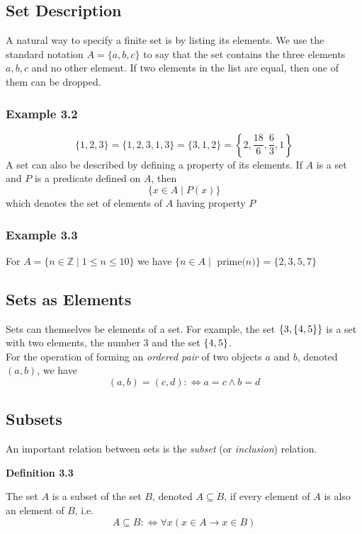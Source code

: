 \documentclass[a4paper]{report}
\newenvironment{definition}[1]{\begin{framed}\centerline{\textbf{Definition #1}}\noindent\hspace{-1.1mm}}{\end{framed}}
\newcommand{\Z}{\mathbb{Z}}
\DeclarePairedDelimiter\cur{\{}{\}}
\begin{document}
\subsection{Set Description}
A natural way to specify a finite set is by listing its elements. We use the standard notation $A=\{a,b,c\}$ to say that the set contains the three elements $a,b,c$ and no other element. If two elements in the list are equal, then one of them can be dropped. 

\subsubsection*{Example 3.2}
\[\{1,2,3\}=\{1,2,3,1,3\}=\{3,1,2\}=\left\{2,\frac{18}{6},\frac{6}{3},1\right\}\]
A set can also be described by defining a property of its elements. If $A$ is a set and $P$ is a predicate defined on $A$, then \[\{x\in A\mid P(x)\}\] which denotes the set of elements of $A$ having property $P$

\subsubsection*{Example 3.3}
For $A=\{n\in\Z\mid 1\leq n\leq 10\}$ we have $\{n\in A\mid\text{ prime($n$)}\}=\{2,3,5,7\}$

\subsection{Sets as Elements}
Sets can themselves be elements of a set. For example, the set $\cur{3,\cur{4,5}}$ is a set with two elements, the number 3 and the set $\cur{4,5}$.\\

For the operation of forming an \emph{ordered pair} of two objects $a$ and $b$, denoted $(a,b)$, we have \[(a,b)=(c,d):\Longleftrightarrow a=c\land b=d\]

\subsection{Subsets}
An important relation between sets is the \emph{subset} (or \emph{inclusion}) relation.

\begin{definition}{3.3}
The set $A$ is a subset of the set $B$, denoted $A\subseteq B$, if every element of $A$ is also an element of $B$, i.e. \[A\subseteq B:\Longleftrightarrow\forall x(x\in A\to x\in B)\]
\end{definition}
\end{document}
